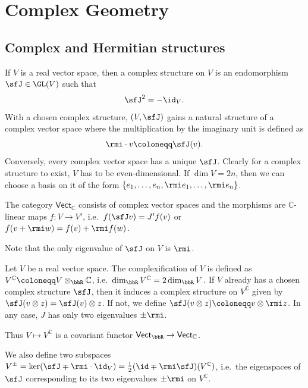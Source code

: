 \clearpage
\section{Complex Geometry}


\subsection{Complex and Hermitian structures}

\begin{defn}
    If $V$ is a real vector space, then a complex structure on $V$ is an endomorphism $\sfJ\in \GL(V)$ such that 
    \[\sfJ^2=-\id_V.\]
    With a chosen complex structure, $(V,\sfJ)$ gains a natural structure of a complex vector space where the multiplication by the imaginary unit is defined as
    \[\rmi\cdot v\coloneqq \sfJ(v).\]
    Conversely, every complex vector space has a unique $\sfJ$. Clearly for a complex structure to exist, $V$ has to be even-dimensional. If $\dim V=2n$, then we can choose a basis on it of the form $\{e_1,\ldots,e_n,\rmi e_1,\ldots,\rmi e_n\}$.
    
    The category $\mathsf{Vect}_{\mathbb{C}}$ consists of complex vector spaces and the morphisms are $\mathbb{C}$-linear maps $f:V\to V'$, i.e.\ $f(\sfJ v)=J' f(v)$ or $f(v+\rmi w)=f(v)+\rmi f(w)$.
\end{defn}

Note that the only eigenvalue of $\sfJ$ on $V$ is $\rmi$.

\begin{defn}[Complexification]\label{def complexification}
    Let $V$ be a real vector space. The complexification of $V$ is defined as $V^\mathbb{C}\coloneqq V\otimes_\bbR \mathbb{C}$, i.e.\ $\dim_\bbR V^\mathbb{C}=2\dim_\bbR V$. If $V$ already has a chosen complex structure $\sfJ$, then it induces a complex structure on $V^\mathbb{C}$ given by $\sfJ(v\otimes z)=\sfJ(v)\otimes z$. If not, we define $\sfJ(v\otimes z)\coloneqq v\otimes \rmi z$. In any case, $J$ has only two eigenvalues $\pm \rmi$.
    
    Thus $V\mapsto V^{\mathbb{C}}$ is a covariant functor $\mathsf{Vect}_\bbR \to \mathsf{Vect}_\mathbb{C}$.
    
    We also define two subspaces $V^\pm=\ker(\sfJ\mp \rmi\cdot\id_V)=\frac12(\id\mp \rmi \sfJ)(V^\mathbb{C})$, i.e.\ the eigenspaces of $\sfJ$ corresponding to its two eigenvalues $\pm \rmi$ on $V^\mathbb{C}$.
\end{defn}

